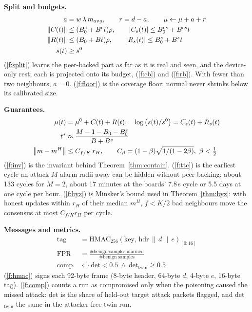 \noindent\textbf{Split and budgets.}
\begin{align}
a&=w\,\lambda\,m_{avg},\qquad r=d-a,\qquad \mu\leftarrow\mu+a+r \label{f:split}\\
\left\lVert C(t) \right\rVert&\le(B_0^c+B^c t)\rho,\qquad |C_s(t)|\le B_0^{cs}+B^{cs}t \label{f:cb}\\
\left\lVert R(t) \right\rVert&\le(B_0+Bt)\rho,\qquad |R_s(t)|\le B_0^s+B^s t \label{f:rb}\\
s(t)&\ge s^0 \label{f:floor}
\end{align}
(\ref{f:split}) learns the peer-backed part as far as it is real and seen, and the device-only rest; each
is projected onto its budget, (\ref{f:cb}) and (\ref{f:rb}). With fewer than two neighbours, $a=0$.
(\ref{f:floor}) is the coverage floor: normal never shrinks below its calibrated size.

\noindent\textbf{Guarantees.}
\begin{align}
\mu(t)&=\mu^0+C(t)+R(t),\quad \log\big(s(t)/s^0\big)=C_s(t)+R_s(t) \label{f:inv}\\
t^\ast&\approx\frac{M-1-B_0-B_0^s}{B+B^s} \label{f:ttc}\\
\left\lVert m-m^H \right\rVert&\le C_{f/K}\,r_H,\qquad C_\beta=(1-\beta)\sqrt{1/(1-2\beta)},\ \beta<\tfrac12 \label{f:byz}
\end{align}
(\ref{f:inv}) is the invariant behind Theorem~\ref{thm:contain}. (\ref{f:ttc}) is the earliest cycle an
attack $M$ alarm radii away can be hidden without peer backing: about 133 cycles for $M=2$, about 17
minutes at the boards' 7.8\,s cycle or 5.5 days at one cycle per hour. (\ref{f:byz}) is Minsker's bound
used in Theorem~\ref{thm:byz}: with honest updates within $r_H$ of their median $m^H$, $f<K/2$ bad
neighbours move the consensus at most $C_{f/K}r_H$ per cycle.

\noindent\textbf{Messages and metrics.}
\begin{align}
\mathrm{tag}&=\mathrm{HMAC}_{256}(\mathrm{key},\,\mathrm{hdr}\,\|\,d\,\|\,e)_{[0:16]} \label{f:hmac}\\
\mathrm{FPR}&=\frac{\#\text{benign samples alarmed}}{\#\text{benign samples}} \label{f:fpr}\\
\mathrm{comp.}&\iff \mathrm{det}<0.5\ \wedge\ \mathrm{det}_{\mathrm{twin}}\ge0.5 \label{f:comp}
\end{align}
(\ref{f:hmac}) signs each 92-byte frame (8-byte header, 64-byte $d$, 4-byte $e$, 16-byte tag).
(\ref{f:comp}) counts a run as compromised only when the poisoning caused the missed attack: det is
the share of held-out target attack packets flagged, and det$_{\mathrm{twin}}$ the same in the attacker-free twin run.
